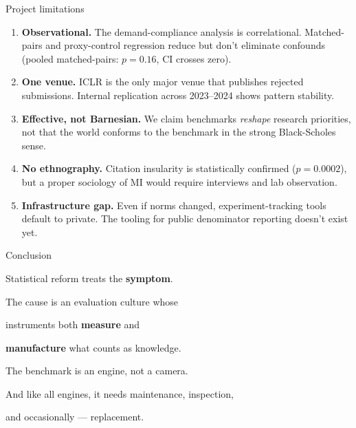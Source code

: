 \documentclass[aspectratio=169,11pt]{beamer}
\begin{document}
\begin{frame}[label=limitations]{Project limitations}

\begin{enumerate}\setlength\itemsep{3pt}
  \item {\small \textbf{Observational.} The demand-compliance analysis is correlational. Matched-pairs and proxy-control regression reduce but don't eliminate confounds (pooled matched-pairs: $p = 0.16$, CI crosses zero).}

  \item {\small \textbf{One venue.} ICLR is the only major venue that publishes rejected submissions. Internal replication across 2023--2024 shows pattern stability.}

  \item {\small \textbf{Effective, not Barnesian.} We claim benchmarks \emph{reshape} research priorities, not that the world conforms to the benchmark in the strong Black-Scholes sense.}

  \item {\small \textbf{No ethnography.} Citation insularity is statistically confirmed ($p = 0.0002$), but a proper sociology of MI would require interviews and lab observation.}

  \item {\small \textbf{Infrastructure gap.} Even if norms changed, experiment-tracking tools default to private. The tooling for public denominator reporting doesn't exist yet.}
\end{enumerate}
\end{frame}

\begin{frame}[label=conclusion]{Conclusion}

\begin{center}
\vspace{0.5em}
{\Large Statistical reform treats the \textbf{symptom}.}

\vspace{0.6em}

{\Large The cause is an evaluation culture whose}

\vspace{0.2em}

{\Large instruments both \textbf{\textcolor{camera}{measure}} and}

\vspace{0.2em}

{\Large \textbf{\textcolor{engine}{manufacture}} what counts as knowledge.}

\vspace{1.2em}

{\small The benchmark is an engine, not a camera.}

\vspace{0.2em}

{\small And like all engines, it needs maintenance, inspection,}

\vspace{0.1em}

{\small and occasionally --- replacement.}
\end{center}
\end{frame}
\end{document}
